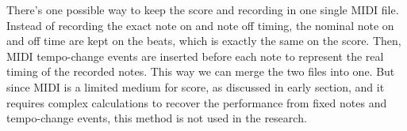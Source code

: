 There's one possible way to keep the score and recording in one single MIDI file. Instead of recording the exact note on and note off timing, the nominal note on and off time are kept on the beats, which is exactly the same on the score. Then, MIDI tempo-change events are inserted before each note to represent the real timing of the recorded notes. This way we can merge the two files into one. But since MIDI is a limited medium for score, as discussed in early section, and it requires complex calculations to recover the performance from fixed notes and tempo-change events, this method is not used in the research.


